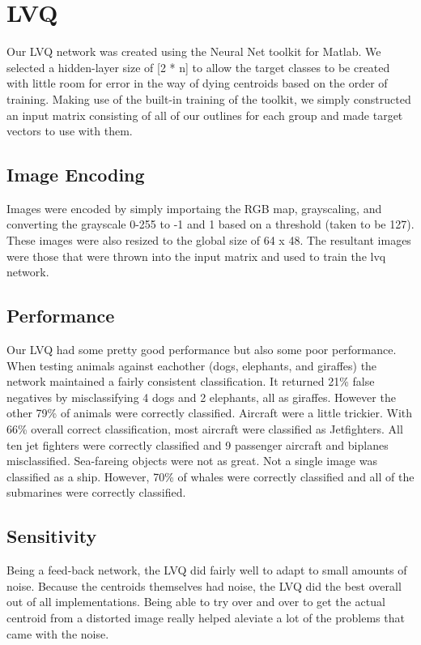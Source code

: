 \documentclass{article}
\begin{document}
\section{LVQ}
Our LVQ network was created using the Neural Net toolkit for Matlab. We selected a hidden-layer size of [2 * n] to allow the target classes to be created with little room for error in the way of dying centroids based on the order of training. Making use of the built-in training of the toolkit, we simply constructed an input matrix consisting of all of our outlines for each group and made target vectors to use with them. 
\subsection{Image Encoding}
Images were encoded by simply importaing the RGB map, grayscaling, and converting the grayscale 0-255 to -1 and 1 based on a threshold (taken to be 127). These images were also resized to the global size of 64 x 48. The resultant images were those that were thrown into the input matrix and used to train the lvq network.

\subsection{Performance}
Our LVQ had some pretty good performance but also some poor performance.  When testing animals against eachother (dogs, elephants, and giraffes) the network maintained a fairly consistent classification.  It returned 21\% false negatives by misclassifying 4 dogs and 2 elephants, all as giraffes.  However the other 79\% of animals were correctly classified.  Aircraft were a little trickier.  With 66\% overall correct classification, most aircraft were classified as Jetfighters. All ten jet fighters were correctly classified and 9 passenger aircraft and biplanes misclassified.  Sea-fareing objects were not as great.  Not a single image was classified as a ship.  However, 70\% of whales were correctly classified and all of the submarines were correctly classified.
\begin{itemize}
\end{itemize}

\subsection{Sensitivity}
Being a feed-back network, the LVQ did fairly well to adapt to small amounts of noise. Because the centroids themselves had noise, the LVQ did the best overall out of all implementations. Being able to try over and over to get the actual centroid from a distorted image really helped aleviate a lot of the problems that came with the noise.
\end{document}
